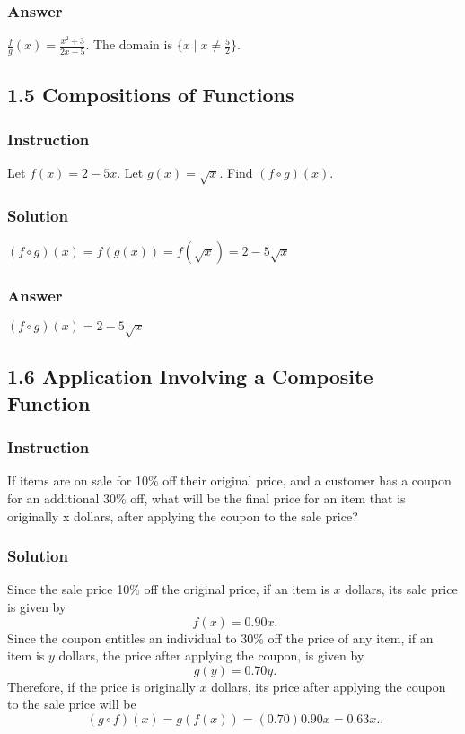 \documentclass[12pt, letterpaper, oneside]{memoir}
\begin{document}
\subsubsection{Answer}

$ \frac{f}{g}(x) = \frac{x^2 + 3}{2x - 5} $. The domain is $ \{ x \mid x \ne \frac{5}{2} \} $.

\subsection*{1.5 Compositions of Functions}

\subsubsection{Instruction}

Let $ f(x) = 2 - 5x $. Let $ g(x) = \sqrt{x} $. Find $ (f \circ g)(x) $.

\subsubsection{Solution}

$ (f \circ g)(x) = f(g(x)) = f(\sqrt{x}) = 2 - 5\sqrt{x} $

\subsubsection{Answer}

$ (f \circ g)(x) = 2 - 5\sqrt{x} $

\subsection*{1.6 Application Involving a Composite Function}

\subsubsection{Instruction}

If items are on sale for 10\% off their original price, and a customer has a coupon for an additional 30\% off, what will be the final price for an item that is originally x dollars, after applying the coupon to the sale price?

\subsubsection{Solution}

Since the sale price 10\% off the original price, if an item is $ x $ dollars, its sale price is given by
$$ \phantom{.}
f(x) = 0.90x
.$$
Since the coupon entitles an individual to 30\% off the price of any item, if an item is $ y $ dollars, the price after applying the coupon, is given by
$$ \phantom{.}
g(y) = 0.70y
.$$
Therefore, if the price is originally $ x $ dollars, its price after applying the coupon to the sale price will be
$$ \phantom{.}
(g \circ f)(x) = g(f(x)) = (0.70)0.90x = 0.63x.
.$$
\end{document}
